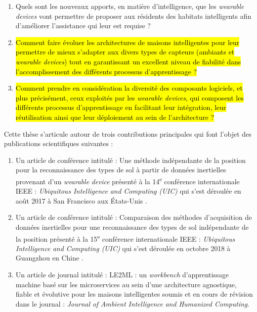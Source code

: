 {{\begin{enumerate}
	\item
		\label{question:1}
		Quels sont les nouveaux apports, en matière d'intelligence, que les \textit{wearable devices} vont permettre de proposer aux résidents des habitats intelligents afin d'améliorer l'assistance qui leur est requise ?
	\item
		\label{question:2}
    \hl{Comment faire évoluer les architectures de maisons intelligentes pour leur permettre de mieux s'adapter aux divers types de capteurs (ambiants et \textit{wearable devices}) tout en garantissant un excellent niveau de fiabilité dans l'accomplissement des différents processus d'apprentissage ?}
	\item
    \label{question:3}
    \hl{Comment prendre en considération la diversité des composants logiciels, et plus précisément, ceux exploités par les \textit{wearable devices}, qui composent les différents processus d'apprentissage en facilitant leur intégration, leur réutilisation ainsi que leur déploiement au sein de l'architecture ?}
\end{enumerate}

Cette thèse s'articule autour de trois contributions principales qui font l'objet des publications scientifiques suivantes :

\begin{enumerate}
	\item
		\label{pub:1}
		Un article de conférence intitulé : \og Une méthode indépendante de la position pour la reconnaissance des types de sol à partir de données inertielles provenant d'un \textit{wearable device} \fg présenté à la 14\textsuperscript{e} conférence internationale IEEE : \textit{Ubiquitous Intelligence and Computing (UIC)} qui s'est déroulée en août 2017 à San Francisco aux États-Unis \citep{Thullier2017}.
	\item
		\label{pub:2}
		Un article de conférence intitulé : \og Comparaison des méthodes d'acquisition de données inertielles pour une reconnaissance des types de sol indépendante de la position \fg présenté à la 15\textsuperscript{e} conférence internationale IEEE : \textit{Ubiquitous Intelligence and Computing (UIC)} qui s'est déroulée en octobre 2018 à Guangzhou en Chine \citep{Thullier2018}.
	\item
		\label{pub:3}
		Un article de journal intitulé : \og LE2ML : un \textit{workbench} d'apprentissage machine basé sur les microservices au sein d'une architecture agnostique, fiable et évolutive pour les maisons intelligentes \fg soumis et en cours de révision dans le journal : \textit{Journal of Ambient Intelligence and Humanized Computing}.
\end{enumerate}

}}
